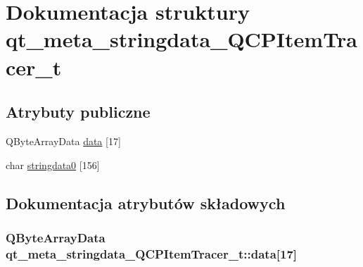 \hypertarget{structqt__meta__stringdata___q_c_p_item_tracer__t}{}\section{Dokumentacja struktury qt\+\_\+meta\+\_\+stringdata\+\_\+\+Q\+C\+P\+Item\+Tracer\+\_\+t}
\label{structqt__meta__stringdata___q_c_p_item_tracer__t}
\subsection*{Atrybuty publiczne}
\begin{DoxyCompactItemize}
\item 
Q\+Byte\+Array\+Data \hyperlink{structqt__meta__stringdata___q_c_p_item_tracer__t_a22eae99e6c4a456148200505b43289b8}{data} \mbox{[}17\mbox{]}
\item 
char \hyperlink{structqt__meta__stringdata___q_c_p_item_tracer__t_a716a4a42fdc434d4a1e9e7b141e3715d}{stringdata0} \mbox{[}156\mbox{]}
\end{DoxyCompactItemize}


\subsection{Dokumentacja atrybutów składowych}
\subsubsection[{\texorpdfstring{data}{data}}]{\setlength{\rightskip}{0pt plus 5cm}Q\+Byte\+Array\+Data qt\+\_\+meta\+\_\+stringdata\+\_\+\+Q\+C\+P\+Item\+Tracer\+\_\+t\+::data\mbox{[}17\mbox{]}}\hypertarget{structqt__meta__stringdata___q_c_p_item_tracer__t_a22eae99e6c4a456148200505b43289b8}{}\label{structqt__meta__stringdata___q_c_p_item_tracer__t_a22eae99e6c4a456148200505b43289b8}
